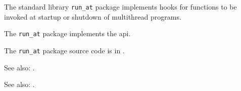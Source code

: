 
The standard library {\tt run\_at} package implements hooks for 
functions to be invoked at startup or shutdown of multithread programs.

The {\tt run\_at} package implements the  api.

The {\tt run\_at} package source code is in .

See also: .

See also: .



